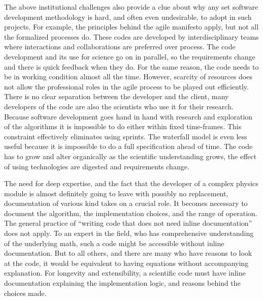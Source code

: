 The above institutional challenges also provide a clue about why any
set software development methodology is hard, and often even
undesirable, to adopt in such projects. For example, the principles
behind the agile manifesto apply, but not all the formalized processes
do.  
These codes are developed by interdisciplinary teams where
interactions and collaborations are preferred over process. The code
development and its use for science go on in parallel, so the
requirements change and there is quick feedback when they do.  For the
same reason, the code needs to be in working condition almost all the
time. However, scarcity of resources does not allow the professional roles in
the agile process to be played out efficiently.  There is no clear
separation between the developer and the client, many developers of
the code are also the scientists who use it for their research. 
Because software development goes hand in hand with research and
exploration of the algorithms it is impossible to do either within
fixed time-frames. This constraint effectively eliminates using
sprints.  The waterfall model is even less useful because it is
impossible to do a full specification ahead of time. The code has to
grow and alter organically as the scientific understanding grows, the
effect of using technologies are digested and requirements change.

The need for deep expertise, and the fact that the developer of a
complex physics module is almost definitely going to leave with
possibly no replacement, documentation of various kind takes on a
crucial role. It becomes necessary to document the algorithm, the
implementation choices, and the range of operation. The general
practice of ``writing code that does not need inline documentation''
does not apply. To an expert in the field, who has comprehensive
understanding of the underlying math, such a code might be accessible
without inline documentation. But to all others, and there are many
who have reasons to look at the code, it would be equivalent to having
equations without accompanying explanation. For longevity and
extensibility, a scientific code must have inline documentation
explaining the implementation logic, and reasons behind the
choices made.   

